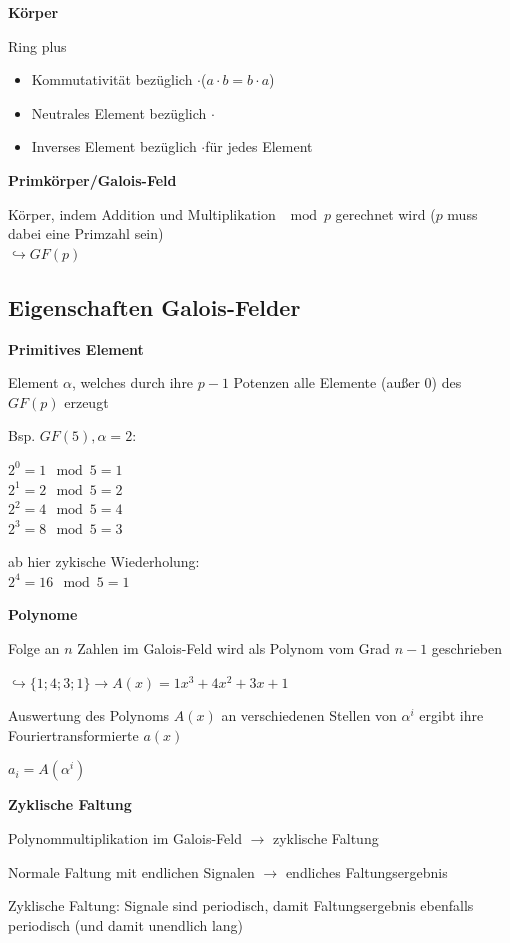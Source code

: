 \textbf{Körper}

Ring plus
\begin{itemize}
    \item Kommutativität bezüglich \frqq $\cdot$\flqq ($a \cdot b = b \cdot a$)
    \item Neutrales Element bezüglich \frqq $\cdot$\flqq
    \item Inverses Element bezüglich \frqq $\cdot$\flqq für jedes Element
\end{itemize}

\textbf{Primkörper/Galois-Feld}

Körper, indem Addition und Multiplikation $\mod p$ gerechnet wird ($p$ muss dabei eine Primzahl sein)\\
$\hookrightarrow GF(p)$

\subsection{Eigenschaften Galois-Felder}

\textbf{Primitives Element}

Element $\alpha$, welches durch ihre $p-1$ Potenzen alle Elemente (außer $0$) des $GF(p)$ erzeugt

Bsp. $GF(5), \alpha = 2$:

$2^0 = 1 \mod 5 = 1$\\
$2^1 = 2 \mod 5 = 2$\\
$2^2 = 4 \mod 5 = 4$\\
$ 2^3 = 8 \mod 5 = 3$

ab hier zykische Wiederholung:\\
$2^4 = 16 \mod 5 = 1$

\textbf{Polynome}

Folge an $n$ Zahlen im Galois-Feld wird als Polynom vom Grad $n-1$ geschrieben

$\displaystyle{
    \hookrightarrow \{ 1; 4; 3; 1 \} \rightarrow A(x) = 1x^3 + 4x^2 + 3x + 1
}$

Auswertung des Polynoms $A(x)$ an verschiedenen Stellen von $\alpha^i$ ergibt ihre Fouriertransformierte $a(x)$

$\displaystyle{
    a_i = A(\alpha^i)
}$

\textbf{Zyklische Faltung}

Polynommultiplikation im Galois-Feld $\rightarrow$ zyklische Faltung

Normale Faltung mit endlichen Signalen $\rightarrow$ endliches Faltungsergebnis

Zyklische Faltung: Signale sind periodisch, damit Faltungsergebnis ebenfalls periodisch (und damit unendlich lang)


